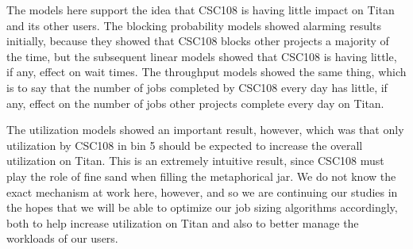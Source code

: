 The models here support the idea that CSC108 is having little impact on Titan
and its other users. The blocking probability models showed alarming results
initially, because they showed that CSC108 blocks other projects a majority of
the time, but the subsequent linear models showed that CSC108 is having little,
if any, effect on wait times. The throughput models showed the same thing,
which is to say that the number of jobs completed by CSC108 every day has
little, if any, effect on the number of jobs other projects complete every day
on Titan.

The utilization models showed an important result, however, which was that only
utilization by CSC108 in bin 5 should be expected to increase the overall
utilization on Titan. This is an extremely intuitive result, since CSC108 must
play the role of fine sand when filling the metaphorical jar. We do not know
the exact mechanism at work here, however, and so we are continuing our studies
in the hopes that we will be able to optimize our job sizing algorithms
accordingly, both to help increase utilization on Titan and also to better
manage the workloads of our users.

